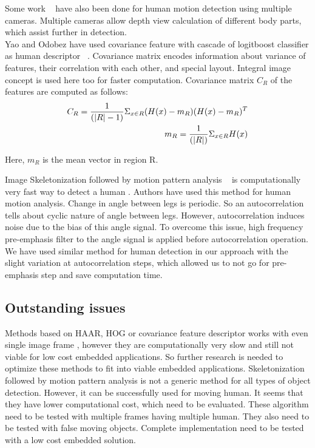 \indent Some work ~\cite{30} have also been done for human motion
detection using multiple cameras. Multiple cameras allow depth view
calculation of different body parts, which assist further in
detection.\\

\indent Yao and Odobez have used covariance feature with cascade of
logitboost classifier as human descriptor ~\cite{19}. Covariance matrix
encodes information about variance of features, their correlation with
each other, and special layout. Integral image concept is used here too
for faster computation. Covariance matrix $C_R$ of the features are
computed as follows:\\
\begin{eqnarray}
C_R = {1 \over {(|R| - 1)}} \Sigma _{x \in R} (H(x) - m_R) (H(x) - m_R)^T \nonumber \\
m_R = {1 \over {(|R|)}} \Sigma _{x \in R} H(x)
\end{eqnarray}

Here, $m_R$ is the mean vector in region R.

\indent Image Skeletonization followed by motion pattern analysis
~\cite{32, 22, 31} is computationally very fast way to detect a human .
Authors have used this method for human motion analysis. Change in angle
between legs is periodic. So an autocorrelation tells about cyclic
nature of angle between legs.  However, autocorrelation induces noise
due to the bias of this angle signal.  To overcome this issue, high
frequency pre-emphasis filter to the angle signal is applied before
autocorrelation operation. We have used similar method for human
detection in our approach with the slight variation at autocorrelation
steps, which allowed us to not go for pre-emphasis step and save
computation time.\\
\subsection{Outstanding issues}
\indent Methods based on HAAR, HOG or covariance feature descriptor
works with even single image frame , however they are computationally
very slow and still not viable for low cost embedded applications. So
further research is needed to optimize these methods to fit into viable
embedded applications. Skeletonization followed by motion pattern
analysis is not a generic method for all types of object detection.
However, it can be successfully used for moving human. It seems that
they have lower computational cost, which need to be evaluated. These
algorithm need to be tested with multiple frames having multiple human.
They also need to be tested with false moving objects. Complete
implementation need to be tested with a low cost embedded solution.
